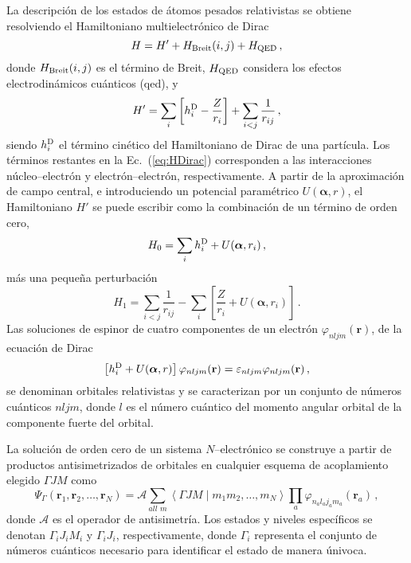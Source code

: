 La descripción de los estados de átomos pesados relativistas se 
obtiene resolviendo el Hamiltoniano multielectrónico de 
Dirac~\cite{Klapisch:71,Klapisch:67,Klapisch:77,BarShalom:01}
\begin{equation}
 H = H' + H_{\mathrm{\mbox{\scriptsize Breit}}}(i,j) +
 H_{\mbox{\scriptsize QED}}\,,
\label{eq:htot}
\end{equation}
donde $H_{\mathrm{\mbox{\scriptsize Breit}}}(i,j)$ es el término de 
Breit, $H_{\mbox{\scriptsize QED}}$ considera los efectos 
electrodinámicos cuánticos (\acs{qed}), y
\begin{equation}
 H' = \sum_i \left[ h_i^{\mbox{\scriptsize D}} - \frac{Z}{r_i}\right]
 + \sum_{i<j}\frac{1}{r_{ij}}\,,
\label{eq:HDirac}
\end{equation}
siendo $h_i^{\mbox{\scriptsize D}}$ el término cinético del 
Hamiltoniano de Dirac de una partícula. Los términos restantes en la
Ec.~(\ref{eq:HDirac}) corresponden a las interacciones 
núcleo--electrón y electrón--electrón, respectivamente. A partir de la 
aproximación de campo central, e introduciendo un potencial paramétrico 
$U(\boldsymbol{\alpha},r)$, el Hamiltoniano $H'$ se puede escribir como 
la combinación de un término de orden cero, 
\begin{equation}
 H_0 = \sum_i h_i^{\mbox{\scriptsize D}} + U(\boldsymbol{\alpha},r_i)\,,
\end{equation}
más una pequeña perturbación
\begin{equation}
 H_1 = \sum_{i<j}\frac{1}{r_{ij}}
 - \sum_i \left[ \frac{Z}{r_i} + U(\boldsymbol{\alpha},r_i) \right]\,.
\end{equation}
Las soluciones de espinor de cuatro componentes de un electrón 
$\varphi_{nljm}(\mathbf{r})$, de la ecuación de Dirac
\begin{equation}
\left[ h_i^{\mbox{\scriptsize D}} +U(\boldsymbol{\alpha},r) \right] 
\varphi_{nljm}(\mathbf{r}) 
= \varepsilon_{nljm} \varphi_{nljm}(\mathbf{r})\,,
\label{eq:ecuacionDirac}
\end{equation}
se denominan orbitales relativistas y se caracterizan por un conjunto de 
números cuánticos $nljm$, donde $l$ es el número cuántico del momento 
angular orbital de la componente fuerte del orbital.

La solución de orden cero de un sistema $N$--electrónico se construye a 
partir de productos antisimetrizados de orbitales en cualquier esquema 
de acoplamiento elegido $\Gamma JM$ como 
\begin{equation}
\Psi_{\Gamma}\left(\mathbf{r}_1,\mathbf{r}_2,\ldots,\mathbf{r}_N\right)
=\mathcal{A}\sum_{all\,\,m}\left\langle\Gamma JM\mid m_1 m_2,\ldots,m_{N}\right
\rangle \prod_{a} \varphi_{n_a l_a j_a m_a}\left(\mathbf{r}_a\right)\,,
\end{equation}
donde $\mathcal{A}$ es el operador de antisimetría. Los estados y niveles 
específicos se denotan $\Gamma_iJ_iM_i$ y $\Gamma_iJ_i$, respectivamente,
donde $\Gamma_i$ representa el conjunto de números cuánticos necesario 
para identificar el estado de manera únivoca. 

